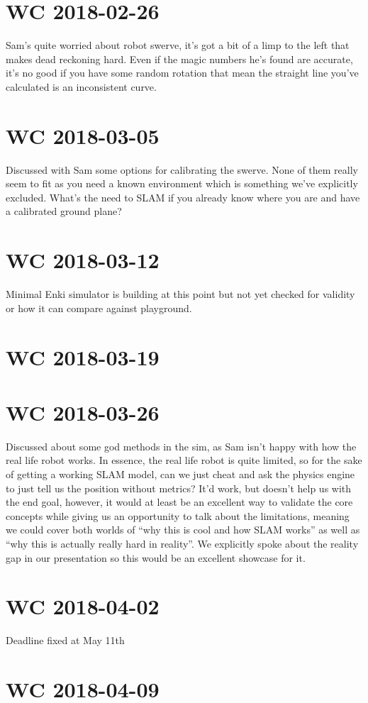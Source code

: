 \documentclass[a4paper]{article}
\begin{document}
\section{WC 2018-02-26}
    Sam's quite worried about robot swerve, it's got a bit of a limp to the left that makes dead reckoning hard. Even if
    the magic numbers he's found are accurate, it's no good if you have some random rotation that mean the straight line
    you've calculated is an inconsistent curve.
\section{WC 2018-03-05}
    Discussed with Sam some options for calibrating the swerve. None of them really seem to fit as you need a known
    environment which is something we've explicitly excluded. What's the need to SLAM if you already know where you are
    and have a calibrated ground plane?
\section{WC 2018-03-12}
    Minimal Enki simulator is building at this point but not yet checked for validity or how it can compare against
    playground.
\section{WC 2018-03-19}
\section{WC 2018-03-26}
    Discussed about some god methods in the sim, as Sam isn't happy with how the real life robot works. In essence, the
    real life robot is quite limited, so for the sake of getting a working SLAM model, can we just cheat and ask the
    physics engine to just tell us the position without metrics? It'd work, but doesn't help us with the end goal,
    however, it would at least be an excellent way to validate the core concepts while giving us an opportunity to talk
    about the limitations, meaning we could cover both worlds of ``why this is cool and how SLAM works'' as well as
    ``why this is actually really hard in reality''. We explicitly spoke about the reality gap in our presentation so
    this would be an excellent showcase for it.
\section{WC 2018-04-02}
    Deadline fixed at May 11th
\section{WC 2018-04-09}
\end{document}
